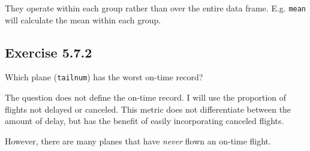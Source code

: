 \documentclass[]{book}
\newenvironment{Shaded}{\begin{snugshade}}{\end{snugshade}}
\newcommand{\CommentTok}[1]{\textcolor[rgb]{0.56,0.35,0.01}{\textit{#1}}}
\newcommand{\DataTypeTok}[1]{\textcolor[rgb]{0.13,0.29,0.53}{#1}}
\newcommand{\DecValTok}[1]{\textcolor[rgb]{0.00,0.00,0.81}{#1}}
\newcommand{\KeywordTok}[1]{\textcolor[rgb]{0.13,0.29,0.53}{\textbf{#1}}}
\newcommand{\NormalTok}[1]{#1}
\newcommand{\OperatorTok}[1]{\textcolor[rgb]{0.81,0.36,0.00}{\textbf{#1}}}
\newcommand{\StringTok}[1]{\textcolor[rgb]{0.31,0.60,0.02}{#1}}
\theoremstyle{plain}
\theoremstyle{remark}
\begin{document}
They operate within each group rather than over the entire data frame.
E.g. \texttt{mean} will calculate the mean within each group.

\hypertarget{exercise-5.7.2}{%
\subsection*{\texorpdfstring{Exercise
{5.7.2}}{Exercise 5.7.2}}\label{exercise-5.7.2}}

Which plane (\texttt{tailnum}) has the worst on-time record?

The question does not define the on-time record. I will use the
proportion of flights not delayed or canceled. This metric does not
differentiate between the amount of delay, but has the benefit of easily
incorporating canceled flights.

\begin{Shaded}
\end{Shaded}

However, there are many planes that have \emph{never} flown an on-time
flight.
\end{document}
